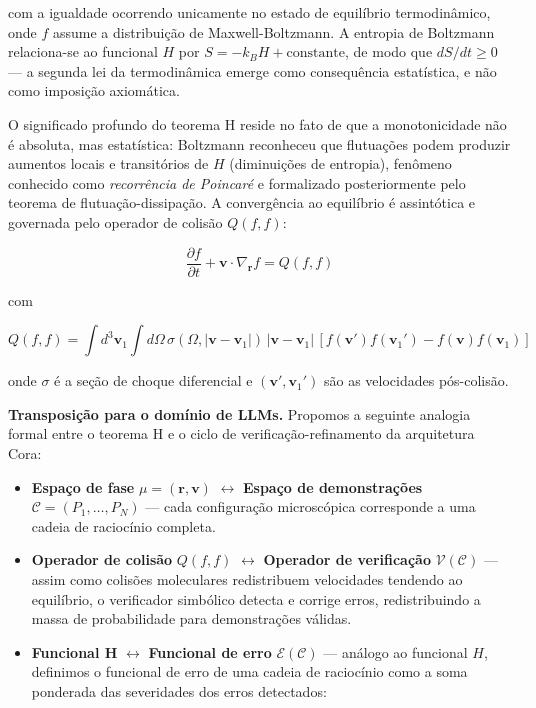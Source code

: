 \documentclass[5p]{elsarticle}
\theoremstyle{remark}
\begin{document}
com a igualdade ocorrendo unicamente no estado de equilíbrio termodinâmico, onde $f$ assume a distribuição de Maxwell-Boltzmann. A entropia de Boltzmann relaciona-se ao funcional $H$ por $S = -k_B H + \text{constante}$, de modo que $dS/dt \geq 0$ --- a segunda lei da termodinâmica emerge como consequência estatística, e não como imposição axiomática.

O significado profundo do teorema H reside no fato de que a monotonicidade não é absoluta, mas estatística: Boltzmann reconheceu que flutuações podem produzir aumentos locais e transitórios de $H$ (diminuições de entropia), fenômeno conhecido como \textit{recorrência de Poincaré} e formalizado posteriormente pelo teorema de flutuação-dissipação. A convergência ao equilíbrio é assintótica e governada pelo operador de colisão $Q(f, f)$:

\begin{equation}
\frac{\partial f}{\partial t} + \mathbf{v} \cdot \nabla_{\mathbf{r}} f = Q(f, f)
\label{eq:boltzmann_eq}
\end{equation}

com

\begin{equation}
Q(f, f) = \int d^3\mathbf{v}_1 \int d\Omega \, \sigma(\Omega, |\mathbf{v} - \mathbf{v}_1|) \, |\mathbf{v} - \mathbf{v}_1| \, [f(\mathbf{v}') f(\mathbf{v}_1') - f(\mathbf{v}) f(\mathbf{v}_1)]
\label{eq:collision}
\end{equation}

onde $\sigma$ é a seção de choque diferencial e $(\mathbf{v}', \mathbf{v}_1')$ são as velocidades pós-colisão.

\textbf{Transposição para o domínio de LLMs.} Propomos a seguinte analogia formal entre o teorema H e o ciclo de verificação-refinamento da arquitetura Cora:

\begin{itemize}
    \item \textbf{Espaço de fase} $\mu = (\mathbf{r}, \mathbf{v})$ $\longleftrightarrow$ \textbf{Espaço de demonstrações} $\mathcal{C} = (P_1, \ldots, P_N)$ --- cada configuração microscópica corresponde a uma cadeia de raciocínio completa.
    
    \item \textbf{Operador de colisão} $Q(f, f)$ $\longleftrightarrow$ \textbf{Operador de verificação} $\mathcal{V}(\mathcal{C})$ --- assim como colisões moleculares redistribuem velocidades tendendo ao equilíbrio, o verificador simbólico detecta e corrige erros, redistribuindo a massa de probabilidade para demonstrações válidas.
    
    \item \textbf{Funcional H} $\longleftrightarrow$ \textbf{Funcional de erro} $\mathcal{E}(\mathcal{C})$ --- análogo ao funcional $H$, definimos o funcional de erro de uma cadeia de raciocínio como a soma ponderada das severidades dos erros detectados:
\end{itemize}
\end{document}
